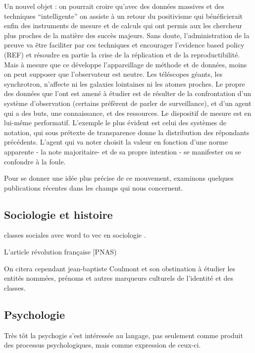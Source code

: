\documentclass[
]{book}
\begin{document}
\begin{itemize}
  Un nouvel objet : on pourrait croire qu'avec des données massives et des techniques ``intelligente'' on assiste à un retour du positivisme qui bénéficierait enfin des instruments de mesure et de calculs qui ont permis aux les chercheur plus proches de la matière des succès majeurs. Sans doute, l'administration de la preuve va être faciliter par ces techniques et encourager l'evidence based policy (REF) et résoudre en partie la crise de la réplication et de la reproductibilité. Mais à mesure que ce développe l'appareillage de méthode et de données, moins on peut supposer que l'observateur est neutre. Les téléscopes géants, les synchrotron, n'affecte ni les galaxies lointaines ni les atomes proches. Le propre des données que l'ont est amené à étudier est de résulter de la confrontation d'un système d'observation (certains préfèrent de parler de surveillance), et d'un agent qui a des buts, une connaissance, et des ressources. Le dispositif de mesure est en lui-même performatif. L'exemple le plus évident est celui des systèmes de notation, qui sous prétexte de transparence donne la distribution des répondants précédents. L'agent qui va noter choisit la valeur en fonction d'une norme apparente - la note majoritaire- et de sa propre intention - se manifester ou se confondre à la foule.
\end{itemize}

Pour se donner une idée plus précise de ce mouvement, examinons quelques publications récentes dans les champs qui nous concernent.

\hypertarget{sociologie-et-histoire}{%
\subsection{Sociologie et histoire}\label{sociologie-et-histoire}}

classes sociales avec word to vec en sociologie \citep{kozlowski_geometry_2019}.

L'article révolution française {[}PNAS)

On citera cependant jean-baptiste Coulmont et son obstination à étudier les entités nommées, prénoms et autres marqueurs culturels de l'identité et des classes.

\hypertarget{psychologie}{%
\subsection{Psychologie}\label{psychologie}}

Très tôt la psychogie s'est intéressée au langage, pas seulement comme produit des processus psychologiques, mais comme expression de ceux-ci.
\end{document}
